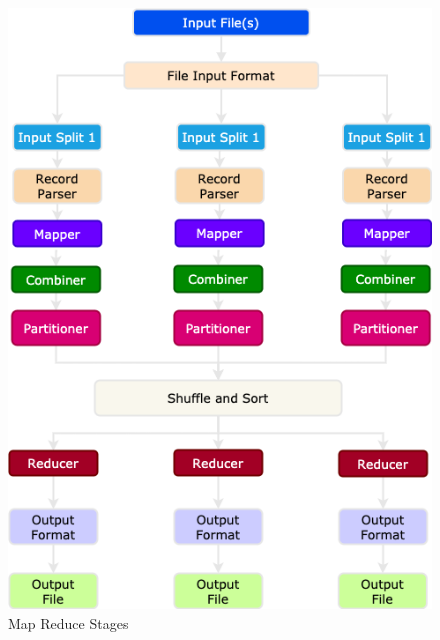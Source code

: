 \begin{frame}

	\begin{figure}
		\includegraphics[height=.925\textheight]{./Figures/chapter-02/Map-Reduce.png}
				\caption{Map Reduce Stages } \label{fig:MRSteps}
	\end{figure}			
\end{frame}
